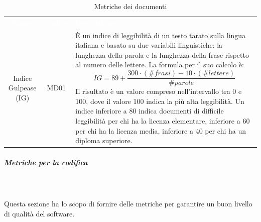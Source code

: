 \begin{table}[H]
\caption{Metriche dei documenti}
	\begin{center}
	\begin{tabular}{ c c L{10cm} }
		\textcolor{white}{\textbf{Nome}} & \textcolor{white}{\textbf{Codice}} & \centerline{\textcolor{white}{\textbf{Descrizione}}} \\
		Indice Gulpease (IG)  & MD01 & È un indice di leggibilità di un testo tarato sulla lingua italiana e basato su due variabili linguistiche: la lunghezza della parola e la lunghezza della frase rispetto al numero delle lettere. La formula per il suo calcolo è: \newline
\[ IG = 89 + \frac{300 \cdot (\#frasi) - 10 \cdot (\#lettere)}{\#parole} \] \newline
Il risultato è un valore compreso nell'intervallo tra 0 e 100, dove il valore 100 indica la più alta leggibilità. Un indice inferiore a 80 indica documenti di difficile leggibilità per chi ha la licenza elementare, inferiore a 60 per chi ha la licenza media, inferiore a 40 per chi ha un diploma superiore.
	\\
	\end{tabular}
	\end{center}	
	\end{table}
\pagebreak
\subparagraph{Metriche per la codifica} \mbox{} \\ \mbox{} \\
Questa sezione ha lo scopo di fornire delle metriche per garantire un buon livello di qualità del software.
